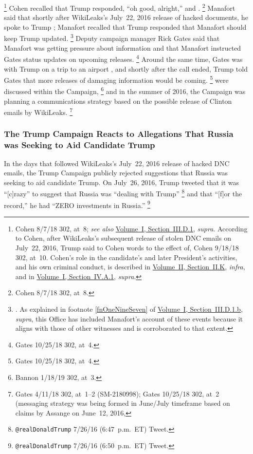 \footnote{Cohen 8/7/18 302, at~8;
\textit{see also} \hyperlink{subsubsection.1.3.4.1}{Volume~I, Section~III.D.1}, \textit{supra}.
According to Cohen, after WikiLeaks's subsequent release of stolen DNC emails on July~22, 2016, Trump said to Cohen words to the effect of, 
Cohen 9/18/18 302, at~10.
Cohen's role in the candidate's and later President's activities, and his own criminal conduct, is described in \hyperlink{subsection.2.2.11}{Volume~II, Section~II.K}, \textit{infra}, and in \hyperlink{subsubsection.1.4.1.1}{Volume~I, Section~IV.A.1}, \textit{supra}.}
Cohen recalled that Trump responded, ``oh good, alright,'' and .%
\footnote{Cohen 8/7/18 302, at~8.}
Manafort said that shortly after WikiLeaks's July~22, 2016 release of hacked documents, he spoke to Trump ; Manafort recalled that Trump responded that Manafort should  keep Trump updated.%
\footnote{.
As explained in footnote \ref{fnOneNineSeven} of \hyperlink{paragraph.1.3.4.1.2}{Volume~I, Section~III.D.1.b}, \textit{supra}, this Office has included Manafort's account of these events because it aligns with those of other witnesses and is corroborated to that extent.}
Deputy campaign manager Rick Gates said that Manafort was getting pressure about  information and that Manafort instructed Gates  status updates on upcoming releases.%
\footnote{Gates 10/25/18 302, at~4.}
Around the same time, Gates was with Trump on a trip to an airport , and shortly after the call ended, Trump told Gates that more releases of damaging information would be coming.%
\footnote{Gates 10/25/18 302, at~4.}
 were discussed within the Campaign,%
\footnote{Bannon 1/18/19 302, at~3.}
and in the summer of 2016, the Campaign was planning a communications strategy based on the possible release of Clinton emails by WikiLeaks.%
\footnote{Gates 4/11/18 302, at~1--2 (SM-2180998);
Gates 10/25/18 302, at~2 (messaging strategy was being formed in June/July timeframe based on claims by Assange on June~12, 2016, }

\subsubsection{The Trump Campaign Reacts to Allegations That Russia was Seeking to Aid Candidate Trump}
In the days that followed WikiLeaks's July~22, 2016 release of hacked DNC emails, the Trump Campaign publicly rejected suggestions that Russia was seeking to aid candidate Trump.
On July~26, 2016, Trump tweeted that it was ``[c]razy'' to suggest that Russia was ``dealing with Trump''%
\footnote{\verb+@realDonaldTrump+ 7/26/16 (6:47~p.m.~ET) Tweet.}
and that ``[f]or the record,'' he had ``ZERO investments in Russia.''%
\footnote{\verb+@realDonaldTrump+ 7/26/16 (6:50~p.m.~ET) Tweet.}

